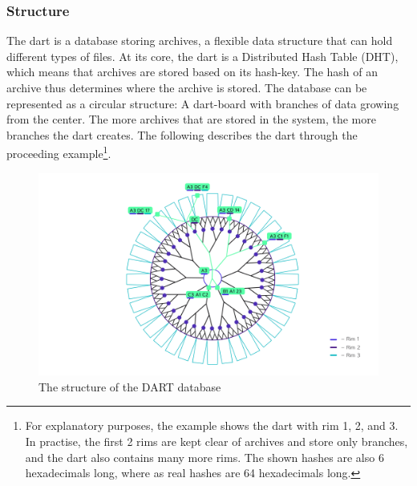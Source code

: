 \subsubsection{Structure}
    The \gls{dart} is a database storing archives, a flexible data structure that can hold different types of files. At its core, the \gls{dart} is a Distributed Hash Table (DHT), which means that archives are stored based on its hash-key. The hash of an archive thus determines where the archive is stored. The database can be represented as a circular structure: A dart-board with branches of data growing from the center. The more archives that are stored in the system, the more branches the \gls{dart} creates. The following describes the \gls{dart} through the proceeding example\footnote{For explanatory purposes, the example shows the \gls{dart} with rim 1, 2, and 3. In practise, the first 2 rims are kept clear of archives and store only branches, and the \gls{dart} also contains many more rims. The shown hashes are also 6 hexadecimals long, where as real hashes are 64 hexadecimals long.}.

    \pagebreak
    
\begin{figure}[H]
 \centering
 \includegraphics[width=1 \textwidth]{figures/dart_structure.png}
 \caption{The structure of the DART database}
 \label{fig:dart_structure}
\end{figure}


